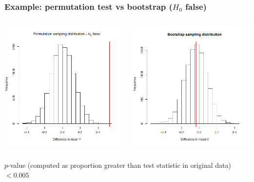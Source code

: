 \documentclass[12pt, 
hyperref={colorlinks=true, linkcolor=blue, urlcolor=cyan}]{beamer}
\newcommand{\myframe}[1]{\begin{frame} \frametitle{#1}}
\begin{document}
\myframe{Example: permutation test vs bootstrap ($H_0$ false)}
\begin{columns}
\begin{column}{.5\textwidth}
\includegraphics[width = 1\textwidth]{perm_false_null.png}
\end{column}
\begin{column}{.5\textwidth}
\includegraphics[width = 1\textwidth]{boot.png}
\end{column}
\end{columns}
$p$-value (computed as proportion greater than test statistic in original data) $< 0.005$
\end{frame}
\end{document}
